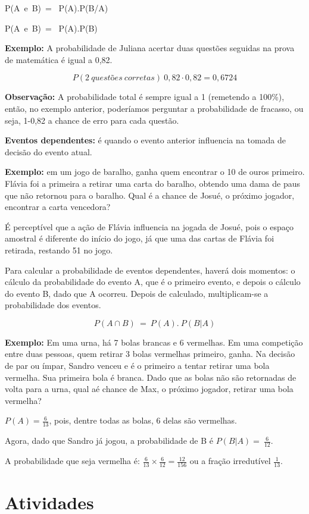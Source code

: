 P(A\ e\ B)\  = \ P(A).P(B/A)

P(A\ e\ B)\  = \ P(A).P(B)\ 

\textbf{Exemplo:} A probabilidade de Juliana acertar duas questões
seguidas na prova de matemática é igual a 0,82.

$$P (2 \ questões \  corretas) \ 0,82 \cdot 0,82 = 0,6724$$

\textbf{Observação:} A probabilidade total é sempre igual a 1 (remetendo
a 100\%), então, no exemplo anterior, poderíamos perguntar a
probabilidade de fracasso, ou seja, 1-0,82 a chance de erro para cada
questão.

\textbf{Eventos dependentes:} é quando o evento anterior influencia na
tomada de decisão do evento atual.

\textbf{Exemplo:} em um jogo de baralho, ganha quem encontrar o 10 de
ouros primeiro. Flávia foi a primeira a retirar uma carta do baralho,
obtendo uma dama de paus que não retornou para o baralho. Qual é a
chance de Josué, o próximo jogador, encontrar a carta vencedora?

É perceptível que a ação de Flávia influencia na jogada de Josué, pois o
espaço amostral é diferente do início do jogo, já que uma das cartas de
Flávia foi retirada, restando 51 no jogo.

Para calcular a probabilidade de eventos dependentes, haverá dois
momentos: o cálculo da probabilidade do evento A, que é o primeiro
evento, e depois o cálculo do evento B, dado que A ocorreu. Depois de
calculado, multiplicam-se a probabilidade dos eventos.

$$P(A \cap B)\  = \ P(A).\ P(B|A)$$

\textbf{Exemplo:} Em uma urna, há 7 bolas brancas e 6 vermelhas. Em uma
competição entre duas pessoas, quem retirar 3 bolas vermelhas primeiro,
ganha. Na decisão de par ou ímpar, Sandro venceu e é o primeiro a tentar
retirar uma bola vermelha. Sua primeira bola é branca. Dado que as bolas
não são retornadas de volta para a urna, qual aé chance de Max, o
próximo jogador, retirar uma bola vermelha?

$P(A) = \frac{6}{13}$, pois, dentre todas as bolas, 6 delas são
vermelhas.

Agora, dado que Sandro já jogou, a probabilidade de B é
$P(B|A) = \ \frac{6}{12}$.

A probabilidade que seja vermelha é:
$\frac{6}{13} \times \frac{6}{12} = \frac{12}{156}$ ou a fração
irredutível $\frac{1}{13}$.

\section{Atividades}

